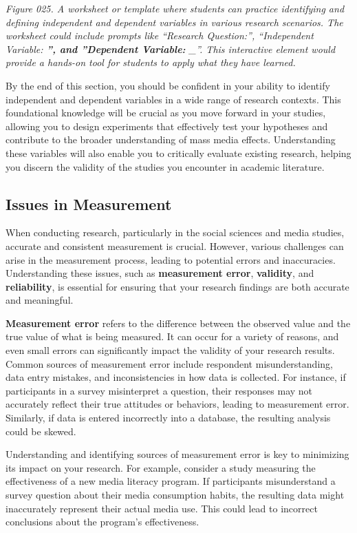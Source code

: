 \documentclass[
]{book}
\begin{document}
\emph{Figure 025. A worksheet or template where students can practice identifying and defining independent and dependent variables in various research scenarios. The worksheet could include prompts like ``Research Question:'', ``Independent Variable: \textbf{'', and ''Dependent Variable: }\_''. This interactive element would provide a hands-on tool for students to apply what they have learned.}

By the end of this section, you should be confident in your ability to identify independent and dependent variables in a wide range of research contexts. This foundational knowledge will be crucial as you move forward in your studies, allowing you to design experiments that effectively test your hypotheses and contribute to the broader understanding of mass media effects. Understanding these variables will also enable you to critically evaluate existing research, helping you discern the validity of the studies you encounter in academic literature.

\subsection{Issues in Measurement}\label{issues-in-measurement}

When conducting research, particularly in the social sciences and media studies, accurate and consistent measurement is crucial. However, various challenges can arise in the measurement process, leading to potential errors and inaccuracies. Understanding these issues, such as \textbf{measurement error}, \textbf{validity}, and \textbf{reliability}, is essential for ensuring that your research findings are both accurate and meaningful.

\textbf{Measurement error} refers to the difference between the observed value and the true value of what is being measured. It can occur for a variety of reasons, and even small errors can significantly impact the validity of your research results. Common sources of measurement error include respondent misunderstanding, data entry mistakes, and inconsistencies in how data is collected. For instance, if participants in a survey misinterpret a question, their responses may not accurately reflect their true attitudes or behaviors, leading to measurement error. Similarly, if data is entered incorrectly into a database, the resulting analysis could be skewed.

Understanding and identifying sources of measurement error is key to minimizing its impact on your research. For example, consider a study measuring the effectiveness of a new media literacy program. If participants misunderstand a survey question about their media consumption habits, the resulting data might inaccurately represent their actual media use. This could lead to incorrect conclusions about the program's effectiveness.
\end{document}
